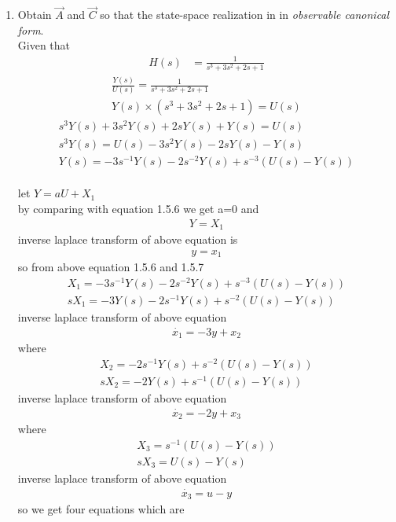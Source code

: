 \begin{enumerate}[label=\thesubsection.\arabic*.,ref=\thesubsection.\theenumi]
\item Obtain $\vec{A}$ and $\vec{C}$ so that the state-space realization in in {\em observable canonical form}.
\\
\solution  Given that
\begin{align}
H(s)&=\frac{1}{s^3+3s^2+2s+1}
\end{align}
\begin{align}
\frac{Y(s)}{U(s)}=\frac{1}{s^3+3s^2+2s+1} \\
Y(s) \times (s^3+3s^2+2s+1) = U(s)
\end{align}
\begin{align}
s^3Y(s)+3s^2Y(s)+2sY(s)+Y(s)=U(s)\\
s^3Y(s)=U(s)-3s^2Y(s)-2sY(s)-Y(s)\\
Y(s)=-3s^{-1}Y(s)-2s^{-2}Y(s)+s^{-3}(U(s)-Y(s))
\end{align}
\\ let $Y=aU+X_{1}$
\\ by comparing with equation 1.5.6 we get a=0 and
\begin{align}
Y=X_{1}
\end{align}
inverse laplace transform of above equation is 
\begin{align}
y=x_{1}
\end{align}
so from above equation 1.5.6 and 1.5.7
\begin{align}
X_{1}=-3s^{-1}Y(s)-2s^{-2}Y(s)+s^{-3}(U(s)-Y(s))\\
sX_{1}=-3Y(s)-2s^{-1}Y(s)+s^{-2}(U(s)-Y(s)) 
\end{align}
inverse laplace transform of above equation 
\begin{align}
\dot{x_{1}}=-3y+x_{2}
\end{align} 
where
\begin{align}
X_{2}=-2s^{-1}Y(s)+s^{-2}(U(s)-Y(s))\\
sX_{2}=-2Y(s)+s^{-1}(U(s)-Y(s))
\end{align} 
inverse laplace transform of above equation 
\begin{align}
\dot{x_{2}}=-2y+x_{3}
\end{align}
where
\begin{align}
X_{3}=s^{-1}(U(s)-Y(s))\\
sX_{3}=U(s)-Y(s)
\end{align} 
inverse laplace transform of above equation 
\begin{align}
\dot{x_{3}}=u-y
\end{align}
so we get four equations which are
\begin{align}

\end{align}
\end{enumerate}
